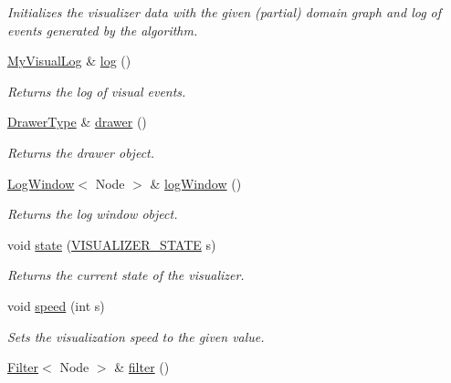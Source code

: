 \begin{DoxyCompactItemize}
\begin{DoxyCompactList}\small\item\em Initializes the visualizer data with the given (partial) domain graph and log of events generated by the algorithm. \end{DoxyCompactList}\item 
\hyperlink{structslb_1_1core_1_1ui_1_1VisualizerData_a8a0541173fd569040f6ce87436f984df}{My\+Visual\+Log} \& \hyperlink{structslb_1_1core_1_1ui_1_1VisualizerData_adc08cfbe1fa989f8e26933a91e71142f}{log} ()
\begin{DoxyCompactList}\small\item\em Returns the log of visual events. \end{DoxyCompactList}\item 
\hyperlink{structslb_1_1core_1_1ui_1_1VisualizerData_af470fbc1d07126b9be849cfd45e24da3}{Drawer\+Type} \& \hyperlink{structslb_1_1core_1_1ui_1_1VisualizerData_adce1791aedbb642aff63b2ca4768eeaf}{drawer} ()
\begin{DoxyCompactList}\small\item\em Returns the drawer object. \end{DoxyCompactList}\item 
\hyperlink{structslb_1_1core_1_1ui_1_1LogWindow}{Log\+Window}$<$ Node $>$ \& \hyperlink{structslb_1_1core_1_1ui_1_1VisualizerData_a1d5d126af5aaf1c48e1a89de87425253}{log\+Window} ()
\begin{DoxyCompactList}\small\item\em Returns the log window object. \end{DoxyCompactList}\item 
void \hyperlink{structslb_1_1core_1_1ui_1_1VisualizerData_a36de3ea60fbeb80d98b635b206232833}{state} (\hyperlink{structslb_1_1core_1_1ui_1_1VisualizerData_a38e4b90b6d4faae3c15629f715440ad9}{V\+I\+S\+U\+A\+L\+I\+Z\+E\+R\+\_\+\+S\+T\+A\+TE} s)
\begin{DoxyCompactList}\small\item\em Returns the current state of the visualizer. \end{DoxyCompactList}\item 
void \hyperlink{structslb_1_1core_1_1ui_1_1VisualizerData_a83ec64aab3b198a5785249b5e82be37e}{speed} (int s)
\begin{DoxyCompactList}\small\item\em Sets the visualization speed to the given value. \end{DoxyCompactList}\item 
\hyperlink{structslb_1_1core_1_1ui_1_1Filter}{Filter}$<$ Node $>$ \& \hyperlink{structslb_1_1core_1_1ui_1_1VisualizerData_a9b63a9c69f4169066add9ea686a3ba5b}{filter} ()

\end{DoxyCompactItemize}
